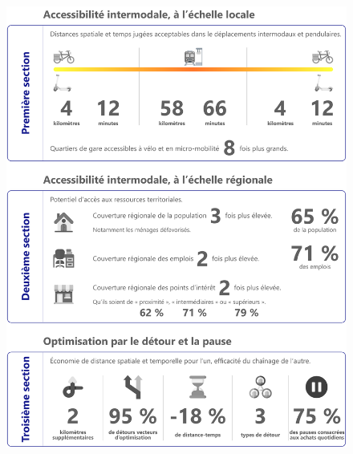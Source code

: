 \begin{refsegment}
\begin{figure}[h!]\vspace*{4pt}
        \caption*{}
        \label{graphical-abstract-chap5}
        \centerline{\includegraphics[width=1\columnwidth]{src/Figures/Graphical-abstract/FR_Graphical_abstract_chap5.pdf}}
        \vspace{5pt}
    \end{figure}


\end{refsegment}
